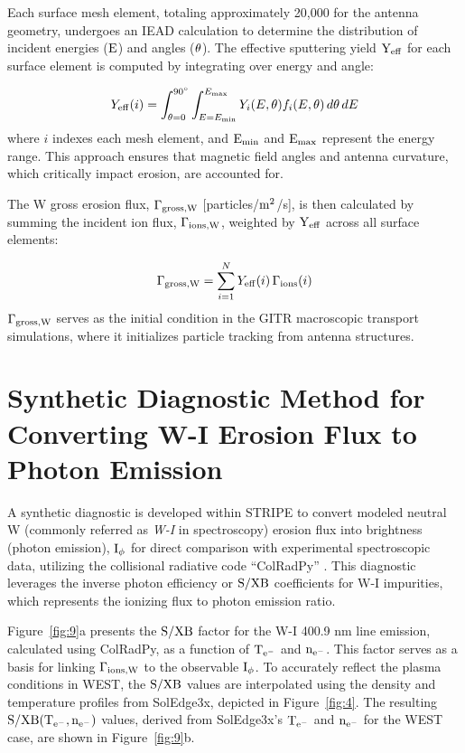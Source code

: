 \documentclass[10pt]{iopart}
\begin{document}
Each surface mesh element, totaling approximately 20,000 for the antenna geometry, undergoes an IEAD calculation to determine the distribution of incident energies (\(\rm E\)) and angles (\(\rm \theta\)). The effective sputtering yield \(\rm Y_{\rm eff}\) for each surface element is computed by integrating over energy and angle:

\begin{equation}
    Y_{\rm eff}(i) = \int_{\theta=0}^{90^\circ} \int_{E=E_{\rm min}}^{E_{\rm max}} Y_i(E, \theta) f_i(E, \theta) \, d\theta \, dE
\end{equation}
where \(i\) indexes each mesh element, and \(\rm E_{\rm min}\) and \(\rm E_{\rm max}\) represent the energy range. This approach ensures that magnetic field angles and antenna curvature, which critically impact erosion, are accounted for.

The W gross erosion flux, \(\rm \Gamma_{gross, W}\) [particles/$\rm m^2$/s], is then calculated by summing the incident ion flux, \(\rm \Gamma_{\rm ions,W}\), weighted by \(\rm Y_{ eff}\) across all surface elements:

\begin{equation}
    \Gamma_{\rm gross,W} = \sum_{i=1}^N Y_{\rm eff}(i) \, \Gamma_{\rm ions}(i)
\end{equation}
\(\rm \Gamma_{\rm gross, W}\) serves as the initial condition in the GITR macroscopic transport simulations, where it initializes particle tracking from antenna structures.

\section{Synthetic Diagnostic Method for Converting W-I Erosion Flux to Photon Emission}
\label{sec:5}

A synthetic diagnostic is developed within STRIPE to convert modeled neutral W (commonly referred as  {\textit {W-I}} in spectroscopy) erosion flux  into brightness (photon emission), $\rm I_\phi$  for direct comparison with experimental spectroscopic data, utilizing the collisional radiative code “ColRadPy” \cite{curt2019}. This diagnostic leverages the inverse photon efficiency or \(\rm S/XB\) coefficients  for W-I impurities, which represents the ionizing flux to photon emission ratio.

Figure~\ref{fig:9}a presents the \( \rm S/XB \) factor for the W-I 400.9 nm line emission, calculated using ColRadPy, as a function of \( \rm T_{e^-} \) and \( \rm n_{e^-} \). This factor serves as a basis for linking \( \rm \Gamma_{\rm ions,W} \) to the observable \( \rm I_\phi \). To accurately reflect the plasma conditions in WEST, the \( \rm S/XB \) values are interpolated using the density and temperature profiles from SolEdge3x, depicted in Figure~\ref{fig:4}. The resulting \( \rm S/XB(T_{e^-}, n_{e^-}) \) values, derived from SolEdge3x’s \( \rm T_{e^-} \) and \( \rm n_{e^-} \) for the WEST case, are shown in Figure~\ref{fig:9}b.
\end{document}
